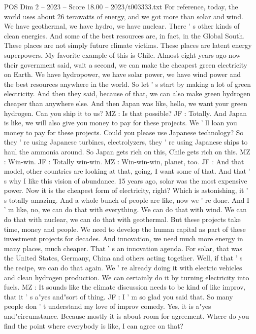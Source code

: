 \begin{textsample}{POS Dim 2 – 2023 – Score 18.00 – 2023/t003333.txt}
For reference, today, the world uses about 26 terawatts of energy, and we got more than solar and wind.
We have geothermal, we have hydro, we have nuclear.
There ' s other kinds of clean energies.
And some of the best resources are, in fact, in the Global South.
These places are not simply future climate victims.
These places are latent energy superpowers.
My favorite example of this is Chile.
Almost eight years ago now their government said, wait a second, we can make the cheapest green electricity on Earth.
We have hydropower, we have solar power, we have wind power and the best resources anywhere in the world.
So let ' s start by making a lot of green electricity.
And then they said, because of that, we can also make green hydrogen cheaper than anywhere else.
And then Japan was like, hello, we want your green hydrogen.
Can you ship it to us?
MZ : Is that possible?
JF : Totally.
And Japan is like, we will also give you money to pay for these projects.
We ' ll loan you money to pay for these projects.
Could you please use Japanese technology?
So they ' re using Japanese turbines, electrolyzers, they ' re using Japanese ships to haul the ammonia around.
So Japan gets rich on this, Chile gets rich on this.
MZ : Win-win.
JF : Totally win-win.
MZ : Win-win-win, planet, too.
JF : And that model, other countries are looking at that, going, I want some of that.
And that ' s why I like this vision of abundance. 15 years ago, solar was the most expensive power.
Now it is the cheapest form of electricity, right?
Which is astonishing, it ' s totally amazing.
And a whole bunch of people are like, now we ' re done.
And I ' m like, no, we can do that with everything.
We can do that with wind.
We can do that with nuclear, we can do that with geothermal.
But these projects take time, money and people.
We need to develop the human capital as part of these investment projects for decades.
And innovation, we need much more energy in many places, much cheaper.
That ' s an innovation agenda.
For solar, that was the United States, Germany, China and others acting together.
Well, if that ' s the recipe, we can do that again.
We ' re already doing it with electric vehicles and clean hydrogen production.
We can certainly do it by turning electricity into fuels.
MZ : It sounds like the climate discussion needs to be kind of like improv, that it ' s a"yes and"sort of thing.
JF : I ' m so glad you said that.
So many people don ' t understand my love of improv comedy.
Yes, it is a"yes and"circumstance.
Because mostly it is about room for agreement.
Where do you find the point where everybody is like, I can agree on that?

\end{textsample}
